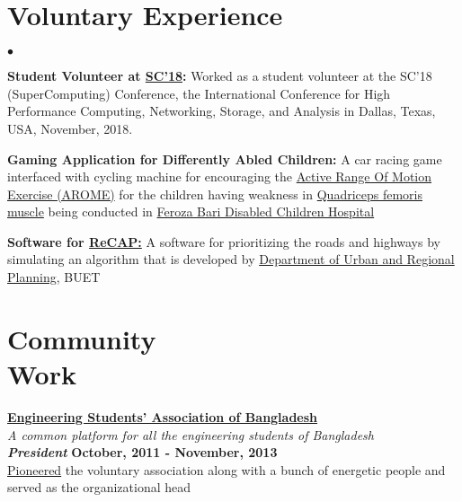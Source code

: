 \documentclass[margin,line]{res}
\newenvironment{list2}{
  \begin{list}{$\bullet$}{%
      \setlength{\itemsep}{0in}
      \setlength{\parsep}{0in} \setlength{\parskip}{0in}
      \setlength{\topsep}{0in} \setlength{\partopsep}{0in} 
      \setlength{\leftmargin}{0.2in}}}{\end{list}}
\begin{document}
\begin{resume}
\section{\sc Voluntary Experience}
\begin{list2}
\item {\bf {Student Volunteer at \href{https://sc18.supercomputing.org/}{SC'18}:}} Worked as a student volunteer at the SC'18 (SuperComputing) Conference, the International Conference for High Performance Computing, Networking, Storage, and Analysis in Dallas, Texas, USA, November, 2018.
\item {\bf {Gaming Application for Differently Abled Children:}} A car racing game interfaced with cycling machine for encouraging the \href{http://www.physiotherapynotes.com/2011/07/physiotherapy-exercises-types.html}{Active Range Of Motion Exercise (AROME)} for the children having weakness in \href{https://en.wikipedia.org/wiki/Quadriceps_femoris_muscle}{Quadriceps femoris muscle} being conducted in \href{http://www.bccw-bd.org/information_about.html}{Feroza Bari Disabled Children Hospital}
\item {\bf Software for \href{http://www.research4cap.org/SitePages/Home.aspx}{ReCAP:}} A software for prioritizing the roads and highways by simulating an algorithm that is developed by \href{http://urp.buet.ac.bd/}{Department of Urban and Regional Planning}, BUET
\end{list2}

\vspace*{-.1in}

\section{\sc Community \\Work}
{\bf \href{http://www.esab.org.bd/}{Engineering Students' Association of Bangladesh}} \\
\textit{A common platform for all the engineering students of Bangladesh \\}
\textbf{{\em President}} \hfill {\bf October, 2011 - November, 2013}\\
\href{https://www.youtube.com/watch?v=2GRKcrF47gM}{Pioneered} the voluntary association along with a bunch of energetic people and served as the organizational head

\end{resume}
\end{document}
